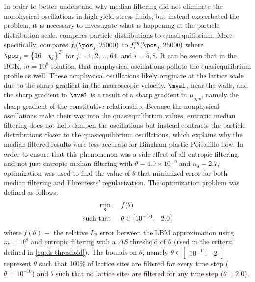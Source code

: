 In order to better understand why median filtering did not eliminate the nonphysical oscillations in high yield stress fluids, but instead exacerbated the problem, it is necessary to investigate what is happening at the particle distribution scale.
 compares particle distributions to quasiequilibrium.
More specifically,  compares $f_i(\pos_j, 25000)$ to $f_i^{eq}(\pos_j, 25000)$ where $\pos_j = \begin{Bmatrix}16 & y_j\end{Bmatrix}^T$ for $j = 1, 2, ..., 64$, and $i = 5, 8$.
It can be seen that in the BGK, $m = 10^8$ solution, that nonphysical oscillations pollute the quasiequilibrium profile as well.
These nonphysical oscillations likely originate at the lattice scale due to the sharp gradient in the macroscopic velocity, $\mvel$, near the walls, and the sharp gradient in $\mvel$ is a result of a sharp gradient in $\mu_{app}$, namely the sharp gradient of the constitutive relationship.
Because the nonphysical oscillations make their way into the quasiequilibrium values, entropic median filtering does not help dampen the oscillations but instead contracts the particle distributions closer to the quasiequilibrium oscillations, which explains why the median filtered results were less accurate for Bingham plastic Poiseuille flow.
In order to ensure that this phenomenon was a side effect of all entropic filtering, and not just entropic median filtering with $\theta = 1.0 \times 10^{-6}$ and $n_s = 2.7$, optimization was used to find the value of $\theta$ that minimized error for both median filtering and Ehrenfests' regularization.
The optimization problem was defined as follows:
\begin{align*}
  \min_\theta \hspace{0.2in} & f(\theta)\\
  \text{such that} \hspace{0.2in} & \theta \in \begin{bmatrix}10^{-10}, & 2.0\end{bmatrix}
\end{align*}
\noindent where $f(\theta) \equiv $ the relative $L_2$ error between the LBM approximation using $m = 10^8$ and entropic filtering with a $\Delta S$ threshold of $\theta$ (used in the criteria defined in \eqref{eq:ds-threshold}).
The bounds on $\theta$, namely $\theta \in \begin{bmatrix}10^{-10}, & 2\end{bmatrix}$ represent $\theta$ such that 100\% of lattice sites are filtered for every time step ($\theta = 10^{-10}$) and $\theta$ such that no lattice sites are filtered for any time step ($\theta = 2.0$).
